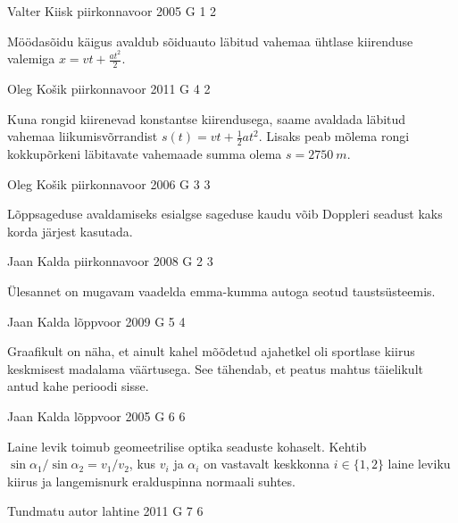 \documentclass[11pt, twoside]{article}
\begin{document}
{%
{Valter Kiisk} %
{piirkonnavoor} %
{2005} %
{G 1} %
{2} %
{

\ifHint
Möödasõidu käigus avaldub sõiduauto läbitud vahemaa ühtlase kiirenduse valemiga $x = vt + \frac{at^2}{2}$.
\fi
}

{Oleg Košik} %
{piirkonnavoor} %
{2011} %
{G 4} %
{2} %
{

\ifHint
Kuna rongid kiirenevad konstantse kiirendusega, saame avaldada läbitud vahemaa liikumisvõrrandist $s(t) = vt + \frac{1}{2}at^2$. Lisaks peab mõlema rongi kokkupõrkeni läbitavate vahemaade summa olema $s = \SI{2750}{m}$.
\fi
}

{Oleg Košik} %
{piirkonnavoor} %
{2006} %
{G 3} %
{3} %
{

\ifHint
Lõppsageduse avaldamiseks esialgse sageduse kaudu võib Doppleri seadust kaks korda järjest kasutada.
\fi
}

{Jaan Kalda} %
{piirkonnavoor} %
{2008} %
{G 2} %
{3} %
{

\ifHint
Ülesannet on mugavam vaadelda emma-kumma autoga seotud taustsüsteemis.
\fi
}

{Jaan Kalda} %
{lõppvoor} %
{2009} %
{G 5} %
{4} %
{

\ifHint
Graafikult on näha, et ainult kahel mõõdetud ajahetkel oli sportlase kiirus keskmisest madalama väärtusega. See tähendab, et peatus mahtus täielikult antud kahe perioodi sisse.
\fi
}

{Jaan Kalda} %
{lõppvoor} %
{2005} %
{G 6} %
{6} %
{

\ifHint
Laine levik toimub geomeetrilise optika seaduste kohaselt. Kehtib $\sin \alpha_{1}/\sin \alpha_{2}=v_{1}/v_{2}$, kus $v_i$ ja $\alpha_i$ on vastavalt keskkonna $i\in \{1, 2\}$ laine leviku kiirus ja langemisnurk eralduspinna normaali suhtes.
\fi
}

{Tundmatu autor} %
{lahtine} %
{2011} %
{G 7} %
{6} %
{

}}
\end{document}
